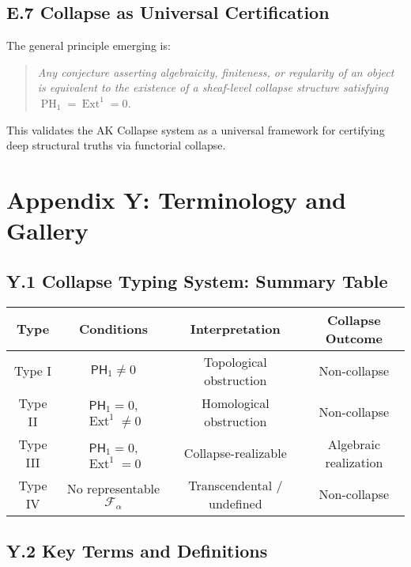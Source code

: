\documentclass[11pt]{article}
\DeclareMathOperator{\Ext}{Ext}
\DeclareMathOperator{\PH}{PH}
\begin{document}
\subsection*{E.7 Collapse as Universal Certification}

The general principle emerging is:

\begin{quote}
\emph{Any conjecture asserting algebraicity, finiteness, or regularity of an object is equivalent to the existence of a sheaf-level collapse structure satisfying $\PH_1 = \Ext^1 = 0$.}
\end{quote}

This validates the AK Collapse system as a universal framework for certifying deep structural truths via functorial collapse.



\section*{Appendix Y: Terminology and Gallery}


\subsection*{Y.1 Collapse Typing System: Summary Table}

\begin{center}
\begin{tabular}{|c|c|c|c|}
\hline
\textbf{Type} & \textbf{Conditions} & \textbf{Interpretation} & \textbf{Collapse Outcome} \\
\hline
Type I & $\mathsf{PH}_1 \ne 0$ & Topological obstruction & Non-collapse \\
\hline
Type II & $\mathsf{PH}_1 = 0$, $\Ext^1 \ne 0$ & Homological obstruction & Non-collapse \\
\hline
Type III & $\mathsf{PH}_1 = 0$, $\Ext^1 = 0$ & Collapse-realizable & Algebraic realization \\
\hline
Type IV & No representable $\mathcal{F}_\alpha$ & Transcendental / undefined & Non-collapse \\
\hline
\end{tabular}
\end{center}

\subsection*{Y.2 Key Terms and Definitions}
\end{document}
